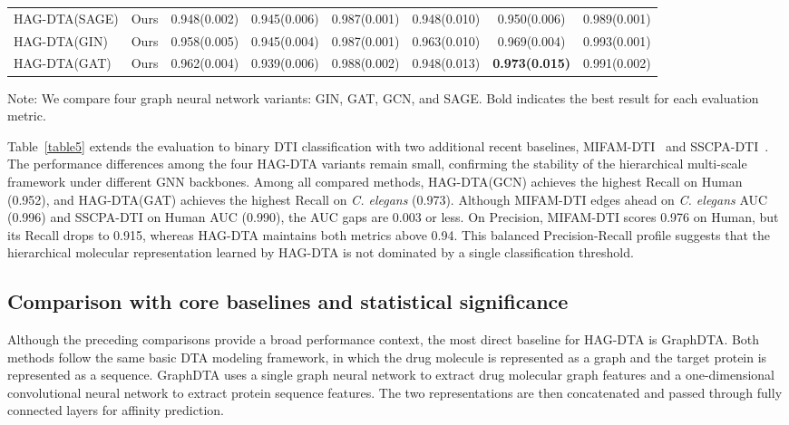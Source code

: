 \documentclass[pdflatex,sn-mathphys-num]{sn-jnl}%
\theoremstyle{thmstyleone}%
\theoremstyle{thmstyletwo}%
\theoremstyle{thmstylethree}%
\begin{document}
\begin{table}[ht]
\begin{tabular*}{\textwidth}{@{\extracolsep{\fill}}lccccccc@{}}
HAG-DTA(SAGE)                                & Ours & 0.948(0.002)          & 0.945(0.006)          & 0.987(0.001)          & 0.948(0.010)          & 0.950(0.006)          & 0.989(0.001)          \\
HAG-DTA(GIN)                                 & Ours & 0.958(0.005)          & 0.945(0.004)          & 0.987(0.001)          & 0.963(0.010)          & 0.969(0.004)          & 0.993(0.001)          \\
HAG-DTA(GAT)                                 & Ours & 0.962(0.004)          & 0.939(0.006)          & 0.988(0.002)          & 0.948(0.013)          & \textbf{0.973(0.015)} & 0.991(0.002)          \\
\bottomrule
\end{tabular*}
\begin{tablenotes}
\item Note: We compare four graph neural network variants: GIN, GAT, GCN, and SAGE. Bold indicates the best result for each evaluation metric.
\end{tablenotes}
\end{table}

Table~\ref{table5} extends the evaluation to binary DTI classification with two additional recent baselines, MIFAM-DTI~\cite{li2024mifamdti} and SSCPA-DTI~\cite{shi2025sscpadti}. The performance differences among the four HAG-DTA variants remain small, confirming the stability of the hierarchical multi-scale framework under different GNN backbones. Among all compared methods, HAG-DTA(GCN) achieves the highest Recall on Human (0.952), and HAG-DTA(GAT) achieves the highest Recall on \textit{C. elegans} (0.973). Although MIFAM-DTI edges ahead on \textit{C. elegans} AUC (0.996) and SSCPA-DTI on Human AUC (0.990), the AUC gaps are 0.003 or less. On Precision, MIFAM-DTI scores 0.976 on Human, but its Recall drops to 0.915, whereas HAG-DTA maintains both metrics above 0.94. This balanced Precision-Recall profile suggests that the hierarchical molecular representation learned by HAG-DTA is not dominated by a single classification threshold.


\subsection{Comparison with core baselines and statistical significance}

Although the preceding comparisons provide a broad performance context, the most direct baseline for HAG-DTA is GraphDTA\cite{nguyen2021graphdta}. Both methods follow the same basic DTA modeling framework, in which the drug molecule is represented as a graph and the target protein is represented as a sequence. GraphDTA uses a single graph neural network to extract drug molecular graph features and a one-dimensional convolutional neural network to extract protein sequence features. The two representations are then concatenated and passed through fully connected layers for affinity prediction.
\end{document}
